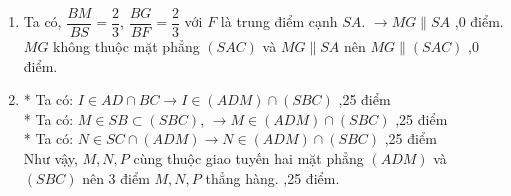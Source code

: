 \begin{ex}
{\begin{enumerate}
			\item Ta có, $ \dfrac{BM}{BS}=\dfrac{2}{3}  $, $ \dfrac{BG}{BF}=\dfrac{2}{3} $ với $ F $ là trung điểm cạnh $ SA $.
			$ \rightarrow  MG \parallel SA  $ ,0 điểm.\\
			$ MG $ không thuộc mặt phẳng $ (SAC) $ và $ MG \parallel SA $ nên $ MG \parallel (SAC) $ ,0 điểm.
			\item 
			* Ta có: $ I \in AD \cap BC \rightarrow I \in (ADM) \cap (SBC) $ ,25 điểm \\
			* Ta có: $ M \in SB \subset (SBC)$, $\rightarrow M \in (ADM) \cap (SBC) $ ,25 điểm \\
			* Ta có: $ N \in SC \cap (ADM) \rightarrow N \in (ADM) \cap (SBC) $ ,25 điểm \\
			Như vậy, $ M, N, P $ cùng thuộc giao tuyến hai mặt phẳng $ (ADM) $ và $ (SBC) $ nên 3 điểm $ M, N, P $ thẳng hàng. ,25 điểm.
		\end{enumerate}		}
	\end{ex}
	
